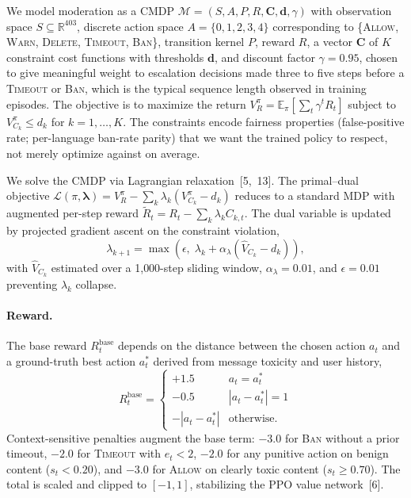 \documentclass{article}
\begin{document}
We model moderation as a CMDP $\mathcal{M} = (S, A, P, R, \mathbf{C}, \mathbf{d}, \gamma)$
with observation space $S \subseteq \mathbb{R}^{403}$, discrete action space
$A = \{0,1,2,3,4\}$ corresponding to \{\textsc{Allow}, \textsc{Warn},
\textsc{Delete}, \textsc{Timeout}, \textsc{Ban}\}, transition kernel $P$, reward
$R$, a vector $\mathbf{C}$ of $K$ constraint cost functions with thresholds
$\mathbf{d}$, and discount factor $\gamma = 0.95$, chosen to give meaningful
weight to escalation decisions made three to five steps before a \textsc{Timeout}
or \textsc{Ban}, which is the typical sequence length observed in training
episodes. The objective is to maximize
the return $V^\pi_R = \mathbb{E}_\pi[\sum_t \gamma^t R_t]$ subject to
$V^\pi_{C_k} \leq d_k$ for $k = 1, \ldots, K$. The constraints encode fairness
properties (false-positive rate; per-language ban-rate parity) that we want the
trained policy to respect, not merely optimize against on average.

We solve the CMDP via Lagrangian relaxation~[5,~13]. The primal--dual objective
$\mathcal{L}(\pi, \boldsymbol{\lambda}) = V^\pi_R - \sum_k \lambda_k (V^\pi_{C_k} - d_k)$
reduces to a standard MDP with augmented per-step reward
$\tilde{R}_t = R_t - \sum_k \lambda_k C_{k,t}$. The dual variable is updated by
projected gradient ascent on the constraint violation,
\begin{equation}\label{eq:lambda_update}
  \lambda_{k+1} = \max\!\left(\epsilon,\;
    \lambda_k + \alpha_\lambda (\hat{V}_{C_k} - d_k)\right),
\end{equation}
with $\hat{V}_{C_k}$ estimated over a 1{,}000-step sliding window,
$\alpha_\lambda = 0.01$, and $\epsilon = 0.01$ preventing $\lambda_k$ collapse.

\paragraph{Reward.}
The base reward $R^{\text{base}}_t$ depends on the distance between the chosen
action $a_t$ and a ground-truth best action $a^*_t$ derived from message toxicity
and user history,
\begin{equation}\label{eq:base_reward}
  R^{\text{base}}_t =
  \begin{cases}
    +1.5 & a_t = a^*_t \\
    -0.5 & |a_t - a^*_t| = 1 \\
    -|a_t - a^*_t| & \text{otherwise.}
  \end{cases}
\end{equation}
Context-sensitive penalties augment the base term: $-3.0$ for \textsc{Ban}
without a prior timeout, $-2.0$ for \textsc{Timeout} with $e_t < 2$, $-2.0$ for
any punitive action on benign content ($s_t < 0.20$), and $-3.0$ for
\textsc{Allow} on clearly toxic content ($s_t \geq 0.70$). The total is scaled
and clipped to $[-1,1]$, stabilizing the PPO value network~[6].
\end{document}
